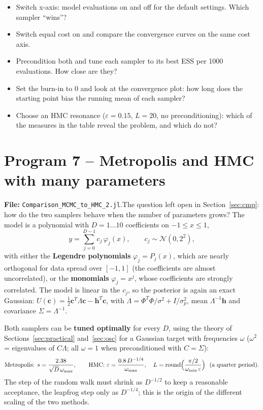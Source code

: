 \documentclass[11pt,a4paper]{article}
\newcommand{\ctl}[1]{\textsf{#1}}                              %
\newcommand{\file}[1]{\texttt{#1}}
\begin{document}
\begin{tryit}
\begin{itemize}
\item Switch \ctl{x-axis: model evaluations} on and off for the default settings. Which sampler ``wins''?
\item Switch \ctl{equal cost} on and compare the convergence curves on the same cost axis.
\item Precondition both and tune each sampler to its best ESS per 1000 evaluations. How close are they?
\item Set the burn-in to 0 and look at the convergence plot: how long does the starting point bias the
  running mean of each sampler?
\item Choose an HMC resonance ($\varepsilon=0.15$, $L=20$, no preconditioning): which of the measures in the
  table reveal the problem, and which do not?
\end{itemize}
\end{tryit}

\clearpage
\section{Program 7 – Metropolis and HMC with many parameters}\label{sec:cmp2}
\textbf{File:} \file{Comparison\_MCMC\_to\_HMC\_2.jl}.\quad The question left open in Section~\ref{sec:cmp}: how
do the two samplers behave when the number of parameters grows? The model is a polynomial with $D=1\dots10$
coefficients on $-1\le x\le1$,
\begin{equation}
  y = \sum_{j=0}^{D-1} c_j\,\varphi_j(x),\qquad c_j\sim\mathcal{N}(0,2^2),
\end{equation}
with either the \textbf{Legendre polynomials} $\varphi_j=P_j(x)$, which are nearly orthogonal for data spread over
$[-1,1]$ (the coefficients are almost uncorrelated), or the \textbf{monomials} $\varphi_j=x^j$, whose
coefficients are strongly correlated. The model is linear in the $c_j$, so the posterior is again an exact
Gaussian: $U(\mathbf c)=\tfrac12\mathbf c^T\Lambda\mathbf c-\mathbf h^T\mathbf c$, with
$\Lambda=\Phi^T\Phi/\sigma^2+I/\sigma_p^2$, mean $\Lambda^{-1}\mathbf h$ and covariance $\Sigma=\Lambda^{-1}$.

Both samplers can be \textbf{tuned optimally} for every $D$, using the theory of Sections~\ref{sec:practical}
and~\ref{sec:osc} for a Gaussian target with frequencies $\omega$ ($\omega^2$ = eigenvalues of $C\Lambda$; all
$\omega=1$ when preconditioned with $C=\Sigma$):
\begin{equation}
  \text{Metropolis: } s=\frac{2.38}{\sqrt{D}\,\omega_\text{max}},\qquad
  \text{HMC: } \varepsilon=\frac{0.8\,D^{-1/4}}{\omega_\text{max}},\quad
  L=\text{round}\Bigl(\frac{\pi/2}{\omega_\text{min}\,\varepsilon}\Bigr)\ \ \text{(a quarter period)}.
\end{equation}
The step of the random walk must shrink as $D^{-1/2}$ to keep a reasonable acceptance, the leapfrog step only as
$D^{-1/4}$; this is the origin of the different scaling of the two methods.
\end{document}
